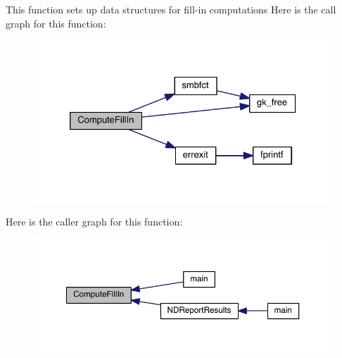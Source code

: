 This function sets up data structures for fill-\/in computations Here is the call graph for this function\+:\nopagebreak
\begin{figure}[H]
\begin{center}
\leavevmode
\includegraphics[width=326pt]{a00329_a929cf6af13d6bf71bc61657211472eed_cgraph}
\end{center}
\end{figure}
Here is the caller graph for this function\+:\nopagebreak
\begin{figure}[H]
\begin{center}
\leavevmode
\includegraphics[width=350pt]{a00329_a929cf6af13d6bf71bc61657211472eed_icgraph}
\end{center}
\end{figure}
\mbox{\label{a00329_a4c231449fdf45c79d8d5107ad63b3451}} 
